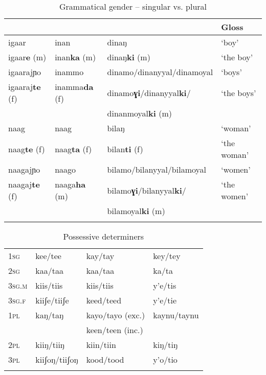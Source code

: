 \documentclass[output=paper,modfonts,nonflat,
hidelinks
]{langsci/langscibook}
\begin{document}
  \begin{table}[t]
  	\caption{{Grammatical gender -- singular vs. plural}}
  	\label{tab:1:Grammatical gender comparison} 
  	\begin{tabularx}{\textwidth}{Xlll} 
  		\lsptoprule
  		\ilit{Marka} & \ilit{Somali} & \ilit{Maay}  &   Gloss  \\ 
  		\midrule
  		igaar & inan & dinaŋ &  `boy' \\
  		igaar\textbf{e} (m) & inan\textbf{ka} (m) & dinaŋ\textbf{ki} (m) &  `the boy'  \\
  		igaarajɲo & inammo & dinamo/dinanyyal/dinamoyal &  `boys' \\
  		igaaraj\textbf{te} (f) & inamma\textbf{da} (f) & dinamo\textbf{ɣi}/dinanyyal\textbf{ki}/ &  `the boys'\\
  		&& dinanmoyal\textbf{ki} (m) & \\
  		\tablevspace
  		naag &  naag & bilaŋ & `woman' \\
  		naag\textbf{te} (f) & naag\textbf{ta} (f) & bilan\textbf{ti} (f) &  `the woman'  \\
  		naagajɲo & naago & bilamo/bilanyyal/bilamoyal &  `women' \\
  		naagaj\textbf{te} (f) & naaga\textbf{ha} (m) & bilamo\textbf{ɣi}/bilanyyal\textbf{ki}/ &  `the women' \\
  		&& bilamoyal\textbf{ki} (m) & \\
  		\lspbottomrule
  	\end{tabularx} 
  \end{table}

 \begin{table}[t]
 	\caption{{Possessive determiners}}
 	\label{tab:1:Possessive determiners}
 	\begin{tabularx}{\textwidth}{XXXX} 
 		\lsptoprule
 		& \ilit{Marka}  & \ilit{Somali} & \ilit{Maay}   \\ 
 		\midrule
 		1\textsc{sg} & kee/tee & kay/tay & key/tey \\
 		2\textsc{sg} & kaa/taa  &   kaa/taa & ka/ta  \\
 		3\textsc{sg.m} & kiis/tiis & kiis/tiis & y'e/tis \\
 		3\textsc{sg.f} & kiiʃe/tiiʃe & keed/teed & y'e/tie \\
 		1\textsc{pl} & kaŋ/taŋ & kayo/tayo (exc.) & kaynu/taynu \\
 		 & & keen/teen (inc.) & \\
 		2\textsc{pl} & kiiŋ/tiiŋ & kiin/tiin & kiŋ/tiŋ  \\
 		3\textsc{pl} & kiiʃoŋ/tiiʃoŋ & kood/tood & y'o/tio \\
 		\lspbottomrule
 	\end{tabularx}
 \end{table}
 
\end{document}
